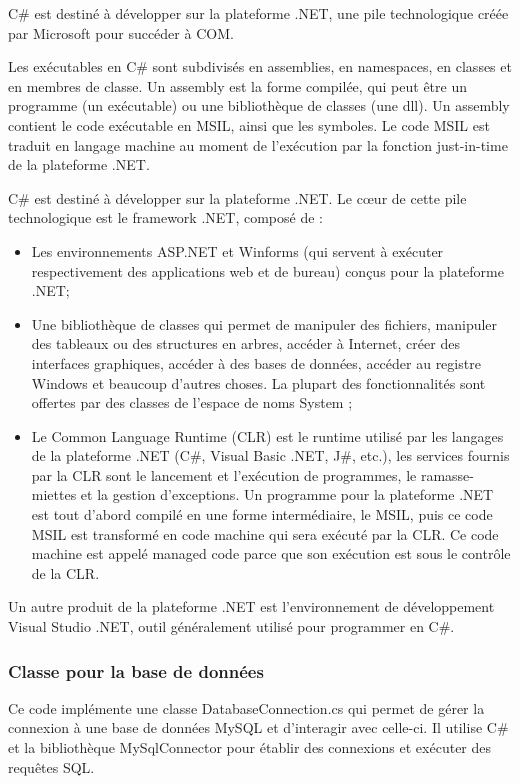 \documentclass[main.tex]{subfiles}
\begin{document}
C\# est destiné à développer sur la plateforme .NET, une pile technologique créée par Microsoft pour succéder à COM.

Les exécutables en C\# sont subdivisés en assemblies, en namespaces, en classes et en membres de classe. Un assembly est la forme compilée, qui peut être un programme (un exécutable) ou une bibliothèque de classes (une dll). Un assembly contient le code exécutable en MSIL, ainsi que les symboles. Le code MSIL est traduit en langage machine au moment de l'exécution par la fonction just-in-time de la plateforme .NET.

C\# est destiné à développer sur la plateforme .NET. Le cœur de cette pile technologique est le framework .NET, composé de :

\begin{itemize}
\item Les environnements ASP.NET et Winforms (qui servent à exécuter respectivement des applications web et de bureau) conçus pour la plateforme .NET;
\item Une bibliothèque de classes qui permet de manipuler des fichiers, manipuler des tableaux ou des structures en arbres, accéder à Internet, créer des interfaces graphiques, accéder à des bases de données, accéder au registre Windows et beaucoup d'autres choses. La plupart des fonctionnalités sont offertes par des classes de l'espace de noms System ;
\item Le Common Language Runtime (CLR) est le runtime utilisé par les langages de la plateforme .NET (C\#, Visual Basic .NET, J\#, etc.), les services fournis par la CLR sont le lancement et l'exécution de programmes, le ramasse-miettes et la gestion d'exceptions. Un programme pour la plateforme .NET est tout d'abord compilé en une forme intermédiaire, le MSIL, puis ce code MSIL est transformé en code machine qui sera exécuté par la CLR. Ce code machine est appelé managed code parce que son exécution est sous le contrôle de la CLR.
\end{itemize}

Un autre produit de la plateforme .NET est l'environnement de développement Visual Studio .NET, outil généralement utilisé pour programmer en C\#.

\subsubsection{Classe pour la base de données}

Ce code implémente une classe DatabaseConnection.cs  qui permet de gérer la connexion à une base de données MySQL et d'interagir avec celle-ci. Il utilise C\# et la bibliothèque MySqlConnector pour établir des connexions et exécuter des requêtes SQL.  
\end{document}
